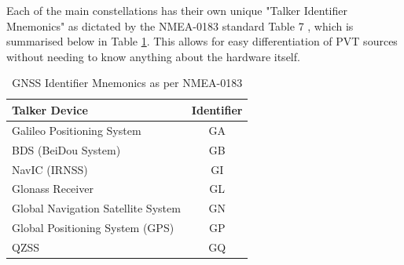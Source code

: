 Each of the main constellations has their own unique "Talker Identifier Mnemonics" as dictated by the NMEA-0183 standard Table 7 \cite{RN71}, which is summarised
below in Table \ref{tab:NMEA Mnemonics}. This allows for easy differentiation of PVT sources without needing to know anything about the hardware itself.


\renewcommand{\arraystretch}{1.5}
\begin{table}
    \begin{center}
        \caption{GNSS Identifier Mnemonics as per NMEA-0183}
        \label{tab:NMEA Mnemonics}
        \begin{tabular}{ l|c }
            \hline
            \textbf{Talker Device} & \textbf{Identifier} \\
            \hline
            Galileo Positioning System & GA \\
            BDS (BeiDou System) & GB \\
            NavIC (IRNSS) & GI \\
            Glonass Receiver & GL \\
            Global Navigation Satellite System & GN \\
            Global Positioning System (GPS) & GP \\
            QZSS & GQ \\
            \hline
        \end{tabular}
    \end{center}
\end{table}
\renewcommand{\arraystretch}{1}

